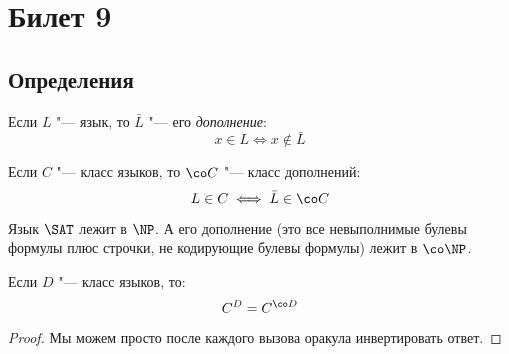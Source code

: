\setcounter{section}{8}
\section{Билет 9}
\subsection{Определения}
	\begin{Def}
		Если $L$ "--- язык, то $\bar L$ "--- его \textit{дополнение}:
		\[ x \in L \iff x \notin \bar L \]
	\end{Def}
	\begin{Def}
		Если $C$ "--- класс языков, то $\co C$ "--- класс дополнений:
		\[ L \in C \iff \bar L \in \co C \]
	\end{Def}
	\begin{exmp}
		Язык $\SAT$ лежит в $\NP$.
		А его дополнение (это все невыполнимые булевы формулы плюс строчки, не кодирующие булевы формулы) лежит в $\co\NP$.
	\end{exmp}
	\begin{assertion}
		Если $D$ "--- класс языков, то:
		\[ C^D = C^{\co D} \]
	\end{assertion}
	\begin{proof}
		Мы можем просто после каждого вызова оракула инвертировать ответ.
	\end{proof}

